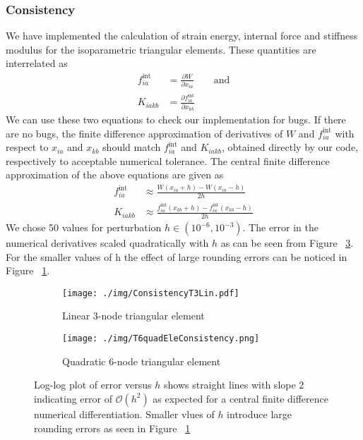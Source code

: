 \documentclass[../main.tex]{subfiles}
\begin{document}
\subsubsection*{Consistency}
We have implemented the calculation of strain energy, internal force
and stiffness modulus for the isoparametric triangular elements. These
quantities are interrelated as
\begin{align*}
  f^{\text{int}}_{ia} &= \frac{\partial W}{\partial x_{ia}} \qquad \text{and}\\[5pt]
  K_{iakb} &= \frac{\partial f^{\text{int}}_{ia}}{\partial x_{kb}}
\end{align*}
We can use these two equations to check our implementation for
bugs. If there are no bugs, the finite difference approximation of
derivatives of $W$ and $f^{\text{int}}_{ia}$ with respect to $x_{ia}$
and $x_{kb}$ should match $f^{\text{int}}_{ia}$ and $K_{iakb}$,
obtained directly by our code, respectively to acceptable numerical
tolerance. The central finite difference approximation of the above
equations are given as
\begin{align*}
  f^{\text{int}}_{ia} &\approx \frac{W(x_{ia}+h) - W(x_{ia}-h)}{2h} \\[5pt]
  K_{iakb} &\approx \frac{f^{\text{int}}_{ia}(x_{kb}+h)-f^{\text{int}}_{ia}(x_{kb}-h)}{2h}
\end{align*}
We chose 50 values for perturbation $h \in (10^{-6},10^{-3})$. The
error in the numerical derivatives scaled quadratically with $h$ as
can be seen from Figure ~\ref{fig:consistency}. For the smaller values
of h the effect of large rounding errors can be noticed in Figure
~\ref{fig:linCon}.
\begin{figure}[ht]
  \centering
  \begin{subfigure}[b]{0.5\textwidth}
    \texttt{[image: ./img/ConsistencyT3Lin.pdf]}
    \caption{Linear 3-node triangular element}
    \label{fig:linCon}
  \end{subfigure}%
  \begin{subfigure}[b]{0.5\textwidth}
    \texttt{[image: ./img/T6quadEleConsistency.png]}
    \caption{Quadratic 6-node triangular element}
    \label{fig:quadCon}
  \end{subfigure}
  \caption{Log-log plot of error versus $h$ shows straight lines with
    slope 2 indicating error of $\mathcal{O}(h^2)$ as expected for a
    central finite difference numerical differentiation. Smaller vlues
    of $h$ introduce large rounding errors as seen in Figure
    ~\ref{fig:linCon}}
  \label{fig:consistency}
\end{figure}
\end{document}
